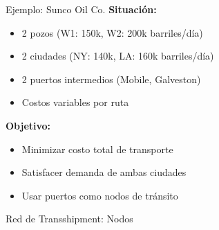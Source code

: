\documentclass{beamer}
\begin{document}
\begin{frame}{Ejemplo: Sunco Oil Co.}
    \textbf{Situación:}
    \begin{itemize}
        \item 2 pozos (W1: 150k, W2: 200k barriles/día)
        \item 2 ciudades (NY: 140k, LA: 160k barriles/día)
        \item 2 puertos intermedios (Mobile, Galveston)
        \item Costos variables por ruta
    \end{itemize}
    
    \vspace{1em}
    \textbf{Objetivo:}
    \begin{itemize}
        \item Minimizar costo total de transporte
        \item Satisfacer demanda de ambas ciudades
        \item Usar puertos como nodos de tránsito
    \end{itemize}
\end{frame}

\begin{frame}{Red de Transshipment: Nodos}
    \begin{center}
    \end{center}
\end{frame}
\end{document}
